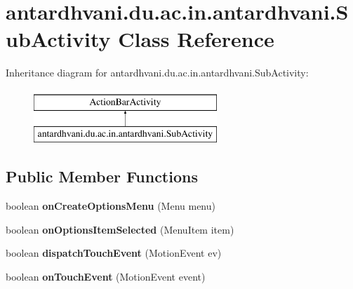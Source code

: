 \hypertarget{classantardhvani_1_1du_1_1ac_1_1in_1_1antardhvani_1_1_sub_activity}{}\section{antardhvani.\+du.\+ac.\+in.\+antardhvani.\+Sub\+Activity Class Reference}
\label{classantardhvani_1_1du_1_1ac_1_1in_1_1antardhvani_1_1_sub_activity}
Inheritance diagram for antardhvani.\+du.\+ac.\+in.\+antardhvani.\+Sub\+Activity\+:\begin{figure}[H]
\begin{center}
\leavevmode
\includegraphics[height=2.000000cm]{classantardhvani_1_1du_1_1ac_1_1in_1_1antardhvani_1_1_sub_activity}
\end{center}
\end{figure}
\subsection*{Public Member Functions}
\begin{DoxyCompactItemize}
\item 
\hypertarget{classantardhvani_1_1du_1_1ac_1_1in_1_1antardhvani_1_1_sub_activity_aba6f473390e52724183ea3a78a3fd06d}{}boolean {\bfseries on\+Create\+Options\+Menu} (Menu menu)\label{classantardhvani_1_1du_1_1ac_1_1in_1_1antardhvani_1_1_sub_activity_aba6f473390e52724183ea3a78a3fd06d}

\item 
\hypertarget{classantardhvani_1_1du_1_1ac_1_1in_1_1antardhvani_1_1_sub_activity_a9888666080b04b3db8505b943c721f77}{}boolean {\bfseries on\+Options\+Item\+Selected} (Menu\+Item item)\label{classantardhvani_1_1du_1_1ac_1_1in_1_1antardhvani_1_1_sub_activity_a9888666080b04b3db8505b943c721f77}

\item 
\hypertarget{classantardhvani_1_1du_1_1ac_1_1in_1_1antardhvani_1_1_sub_activity_abaea2500f6b69eabf00f51d21e4478c4}{}boolean {\bfseries dispatch\+Touch\+Event} (Motion\+Event ev)\label{classantardhvani_1_1du_1_1ac_1_1in_1_1antardhvani_1_1_sub_activity_abaea2500f6b69eabf00f51d21e4478c4}

\item 
\hypertarget{classantardhvani_1_1du_1_1ac_1_1in_1_1antardhvani_1_1_sub_activity_a8cab07b5a86024eb74d42d43f47d0e8b}{}boolean {\bfseries on\+Touch\+Event} (Motion\+Event event)\label{classantardhvani_1_1du_1_1ac_1_1in_1_1antardhvani_1_1_sub_activity_a8cab07b5a86024eb74d42d43f47d0e8b}

\end{DoxyCompactItemize}
